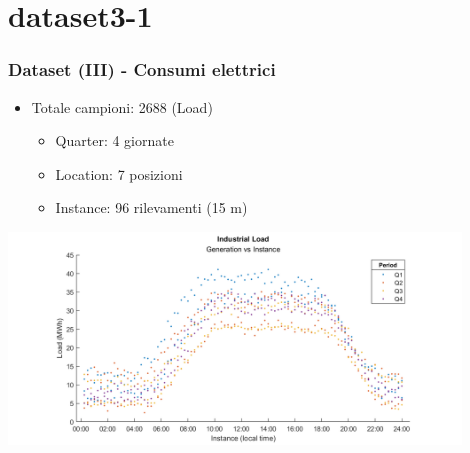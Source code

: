 \documentclass{beamer}
\begin{document}
\section{dataset3-1}
\begin{frame}
    \frametitle{Dataset (III) - Consumi elettrici}
    \vfill
    
    \begin{itemize}
        \item Totale campioni: 2688 (Load) \begin{itemize}   
            \item Quarter: 4 giornate
            \item Location: 7 posizioni
            \item Instance: 96 rilevamenti (15 m)
        \end{itemize}
    \end{itemize}
    \vfill
    \centering
    \includegraphics[width=0.9\textwidth,keepaspectratio]{all_industrial_load_period.png}
        
\end{frame}

\end{document}
